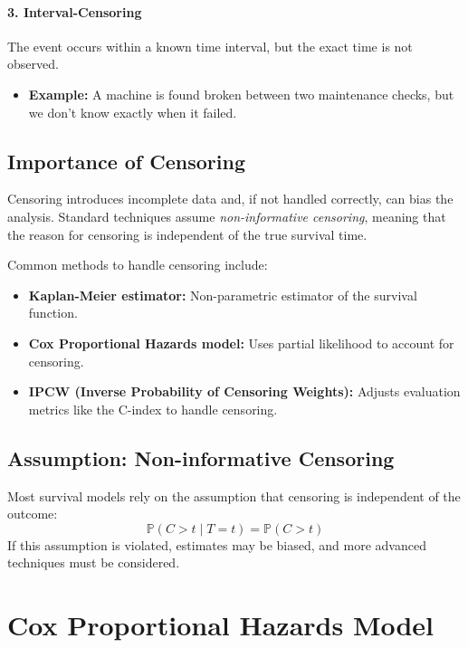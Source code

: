 \documentclass[12pt]{article}
\begin{document}
\paragraph{3. Interval-Censoring}
The event occurs within a known time interval, but the exact time is not observed.

\begin{itemize}
  \item \textbf{Example:} A machine is found broken between two maintenance checks, but we don’t know exactly when it failed.
\end{itemize}

\subsection{Importance of Censoring}

Censoring introduces incomplete data and, if not handled correctly, can bias the analysis. Standard techniques assume \emph{non-informative censoring}, meaning that the reason for censoring is independent of the true survival time.

Common methods to handle censoring include:
\begin{itemize}
  \item \textbf{Kaplan-Meier estimator:} Non-parametric estimator of the survival function.
  \item \textbf{Cox Proportional Hazards model:} Uses partial likelihood to account for censoring.
  \item \textbf{IPCW (Inverse Probability of Censoring Weights):} Adjusts evaluation metrics like the C-index to handle censoring.
\end{itemize}

\subsection{Assumption: Non-informative Censoring}

Most survival models rely on the assumption that censoring is independent of the outcome:
\begin{equation}
\mathbb{P}(C > t \mid T = t) = \mathbb{P}(C > t)
\end{equation}
If this assumption is violated, estimates may be biased, and more advanced techniques must be considered.

\section{Cox Proportional Hazards Model}
\end{document}
